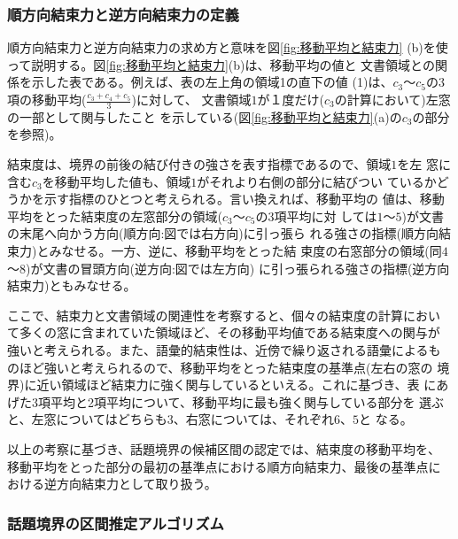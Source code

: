 \subsubsection{順方向結束力と逆方向結束力の定義}


順方向結束力と逆方向結束力の求め方と意味を図\ref{fig:移動平均と結束力}
(b)を使って説明する。図\ref{fig:移動平均と結束力}(b)は、移動平均の値と
文書領域との関係を示した表である。例えば、表の左上角の領域1の直下の値
(1)は、$c_3$〜$c_5$の3項の移動平均($\frac{c_3+c_4+c_5}{3}$)に対して、
文書領域$1$が１度だけ($c_3$の計算において)左窓の一部として関与したこと
を示している(図\ref{fig:移動平均と結束力}(a)の$c_3$の部分を参照)。

結束度は、境界の前後の結び付きの強さを表す指標であるので、領域$1$を左
窓に含む$c_3$を移動平均した値も、領域$1$がそれより右側の部分に結びつい
ているかどうかを示す指標のひとつと考えられる。言い換えれば、移動平均の
値は、移動平均をとった結束度の左窓部分の領域($c_3$〜$c_5$の3項平均に対
しては$1$〜$5$)が文書の末尾へ向かう方向(順方向:図では右方向)に引っ張ら
れる強さの指標(順方向結束力)とみなせる。一方、逆に、移動平均をとった結
束度の右窓部分の領域(同$4$〜$8$)が文書の冒頭方向(逆方向:図では左方向)
に引っ張られる強さの指標(逆方向結束力)ともみなせる。

ここで、結束力と文書領域の関連性を考察すると、個々の結束度の計算におい
て多くの窓に含まれていた領域ほど、その移動平均値である結束度への関与が
強いと考えられる。また、語彙的結束性は、近傍で繰り返される語彙によるも
のほど強いと考えられるので、移動平均をとった結束度の基準点(左右の窓の
境界)に近い領域ほど結束力に強く関与しているといえる。これに基づき、表
にあげた3項平均と2項平均について、移動平均に最も強く関与している部分を
選ぶと、左窓についてはどちらも$3$、右窓については、それぞれ$6$、$5$と
なる。

以上の考察に基づき、話題境界の候補区間の認定では、結束度の移動平均を、
移動平均をとった部分の最初の基準点における順方向結束力、最後の基準点に
おける逆方向結束力として取り扱う。

\subsubsection{話題境界の区間推定アルゴリズム}

